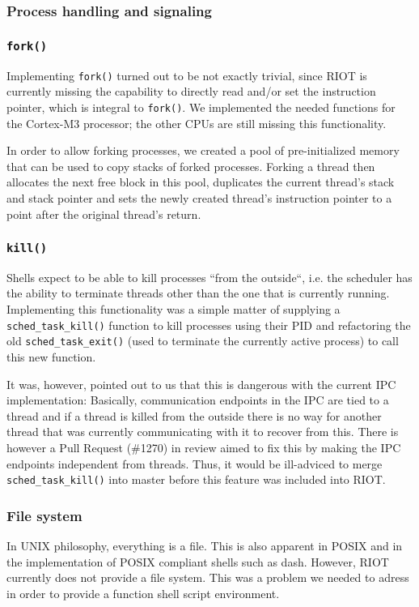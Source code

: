 \documentclass[conference]{IEEEtran}
\begin{document}
\subsubsection{Process handling and signaling}
\label{ssub:Process handling and signaling}
\subsubsection{\texttt{fork()}}
\label{ssub:fork}
Implementing \texttt{fork()} turned out to be not exactly trivial, since
RIOT is currently missing the capability to directly read and/or set the
instruction pointer, which is integral to \texttt{fork()}. We
implemented the needed functions for the Cortex-M3 processor; the other
CPUs are still missing this functionality.

In order to allow forking processes, we created a pool of
pre-initialized memory that can be used to copy stacks of forked
processes. Forking a thread then allocates the next free block in this
pool, duplicates the current thread's stack and stack pointer and sets
the newly created thread's instruction pointer to a point after the
original thread's return.

\subsubsection{\texttt{kill()}}
\label{ssub:kill}
Shells expect to be able to kill processes ``from the outside``, i.e.
the scheduler has the ability to terminate threads other than the one
that is currently running. Implementing this functionality was a simple
matter of supplying a \texttt{sched\_task\_kill()} function to kill
processes using their PID and refactoring the old
\texttt{sched\_task\_exit()} (used to terminate the currently active
process) to call this new function.

It was, however, pointed out to us that this is dangerous with the current IPC
implementation: Basically, communication endpoints in the IPC are tied to a
thread and if a thread is killed from the outside there is no way for another
thread that was currently communicating with it to recover from this. There is
however a Pull Request (\#1270) in review aimed to fix this by making the IPC
endpoints independent from threads. Thus, it would be ill-adviced to merge
\texttt{sched\_task\_kill()} into master before this feature was included into
RIOT.

\subsubsection{File system}
\label{ssub:File system}
In UNIX philosophy, everything is a file. This is also apparent in POSIX
and in the implementation of POSIX compliant shells such as dash.
However, RIOT currently does not provide a file system. This was
a problem we needed to adress in order to provide a function shell
script environment.
\end{document}
